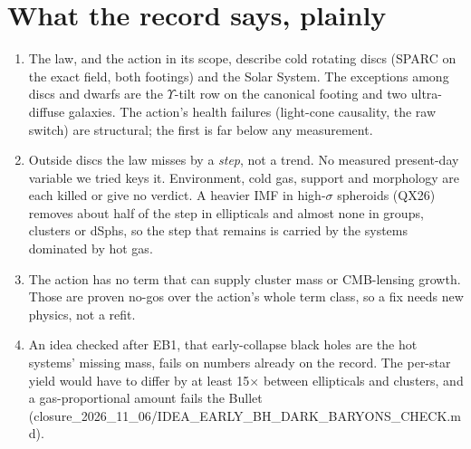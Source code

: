 \documentclass[10pt]{article}
\begin{document}
\section{What the record says, plainly}
\begin{enumerate}
\item The law, and the action in its scope, describe cold rotating discs (SPARC on the exact field, both footings) and the Solar System. The exceptions among discs and dwarfs are the $\Upsilon$-tilt row on the canonical footing and two ultra-diffuse galaxies. The action's health failures (light-cone causality, the raw switch) are structural; the first is far below any measurement.
\item Outside discs the law misses by a \emph{step}, not a trend. No measured present-day variable we tried keys it. Environment, cold gas, support and morphology are each killed or give no verdict. A heavier IMF in high-$\sigma$ spheroids (QX26) removes about half of the step in ellipticals and almost none in groups, clusters or dSphs, so the step that remains is carried by the systems dominated by hot gas.
\item The action has no term that can supply cluster mass or CMB-lensing growth. Those are proven no-gos over the action's whole term class, so a fix needs new physics, not a refit.
\item An idea checked after EB1, that early-collapse black holes are the hot systems' missing mass, fails on numbers already on the record. The per-star yield would have to differ by at least 15$\times$ between ellipticals and clusters, and a gas-proportional amount fails the Bullet (closure\_2026\_11\_06/IDEA\_EARLY\_BH\_DARK\_BARYONS\_CHECK.md).
\end{enumerate}
\end{document}
